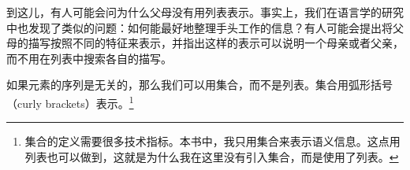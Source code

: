 \begin{figure}[tb]
\ea
{}
\z
\vspace{-\baselineskip}
\end{figure}%
到这儿，有人可能会问为什么父母没有用列表表示。事实上，我们在语言学的研究中也发现了类似的问题：如何能最好地整理手头工作的信息？有人可能会提出将父母的描写按照不同的特征来表示，并指出这样的表示可以说明一个母亲或者父亲，而不用在列表中搜索各自的描写。

如果元素的序列是无关的，那么我们可以用集合，而不是列表。集合用弧形括号（curly brackets）表示。\footnote{%
集合的定义需要很多技术指标。本书中，我只用集合来表示语义信息。这点用列表也可以做到，这就是为什么我在这里没有引入集合，而是使用了列表。
}

